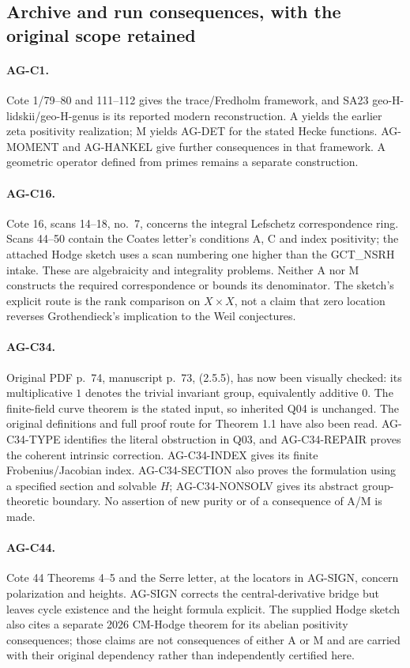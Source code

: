 \documentclass[11pt,a4paper]{article}
\begin{document}
\subsection{Archive and run consequences, with the original scope retained}
\label{ag:archive}

\paragraph{AG-C1.} Cote 1/79--80 and 111--112 gives the trace/Fredholm
framework, and SA23 geo-H-lidskii/geo-H-genus is its reported modern
reconstruction. A yields the earlier zeta positivity realization;
M yields AG-DET for the stated Hecke functions. AG-MOMENT and AG-HANKEL
give further consequences in that framework. A geometric operator defined
from primes remains a separate construction.

\paragraph{AG-C16.} Cote 16, scans 14--18, no.~7, concerns the integral
Lefschetz correspondence ring. Scans 44--50 contain the Coates letter's
conditions A, C and index positivity; the attached Hodge sketch uses a scan
numbering one higher than the GCT\_NSRH intake. These are algebraicity and
integrality problems. Neither A nor M constructs the required
correspondence or bounds its denominator. The sketch's explicit route is
the rank comparison on $X\times X$, not a claim that zero location
reverses Grothendieck's implication to the Weil conjectures.

\paragraph{AG-C34.} Original PDF p.~74, manuscript p.~73, (2.5.5),
has now been visually checked: its multiplicative $1$ denotes the trivial
invariant group, equivalently additive $0$. The finite-field curve theorem
is the stated input, so inherited Q04 is unchanged. The original
definitions and full proof route for Theorem 1.1 have also been read.
AG-C34-TYPE identifies the literal obstruction in Q03, and
AG-C34-REPAIR proves the coherent intrinsic correction. AG-C34-INDEX
gives its finite Frobenius/Jacobian index. AG-C34-SECTION also proves
the formulation using a specified section and solvable $H$;
AG-C34-NONSOLV gives its abstract group-theoretic boundary.
No assertion of new purity or
of a consequence of A/M is made.

\paragraph{AG-C44.} Cote 44 Theorems 4--5 and the Serre letter, at the
locators in AG-SIGN, concern polarization and heights. AG-SIGN corrects
the central-derivative bridge but leaves cycle existence and the
height formula explicit. The supplied Hodge sketch also cites a separate
2026 CM-Hodge theorem for its abelian positivity consequences; those
claims are not consequences of either A or M and are carried with
their original dependency rather than independently certified here.
\end{document}

